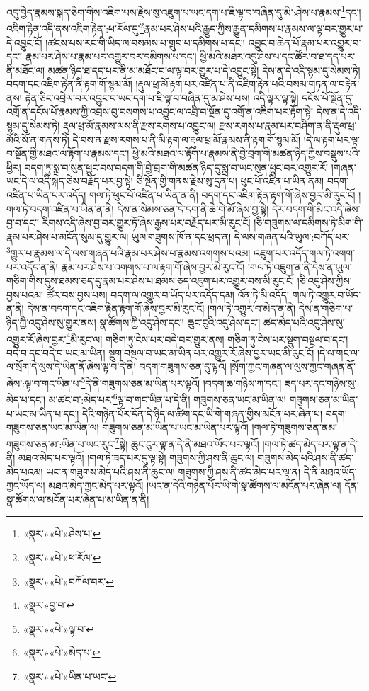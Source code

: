 འདུ་བྱེད་རྣམས་སྐད་ཅིག་གིས་འཇིག་པས་རྗེས་སུ་འཇུག་པ་ཡང་དག་པ་ཇི་ལྟ་བ་བཞིན་དུ་མི་:ཤེས་པ་རྣམས་\footnote{«སྣར་»«པེ་»ཤེས་པ་}དང་། འཇིག་རྟེན་འདི་ནས་འཇིག་རྟེན་:ཕ་རོལ་དུ་\footnote{«སྣར་»«པེ་»ཕ་རོལ་}རྣམ་པར་ཤེས་པའི་རྒྱུད་ཀྱིས་རྒྱུན་དམིགས་པ་རྣམས་ལ་ལྟ་བར་གྱུར་པ་དེ་འབྱུང་ངོ། །ཚངས་པས་རང་གི་ཡིད་ལ་བསམས་པ་གྲུབ་པ་དམིགས་པ་དང་། འབྱུང་བ་ཆེན་པོ་རྣམ་པར་འགྱུར་བ་དང་། རྣམ་པར་ཤེས་པ་རྣམ་པར་འགྱུར་བར་དམིགས་པ་དང་། ཕྱི་མའི་མཐར་འདུ་ཤེས་པ་དང་ཚོར་བ་ཐ་དད་པར་ནི་མཐོང་ལ། མཚན་ཉིད་ཐ་དད་པར་ནི་མ་མཐོང་བ་ལ་ལྟ་བར་གྱུར་པ་དེ་འབྱུང་སྟེ། དེས་ན་དེ་འདི་སྙམ་དུ་སེམས་ཏེ། བདག་དང་འཇིག་རྟེན་ནི་རྟག་གོ་སྙམ་མོ། །རྡུལ་ཕྲ་མོ་རྟག་པར་འཛིན་པ་ནི་འཇིག་རྟེན་པའི་བསམ་གཏན་ལ་བརྟེན་ནས། རྟེན་ཅིང་འབྲེལ་བར་འབྱུང་བ་ཡང་དག་པ་ཇི་ལྟ་བ་བཞིན་དུ་མ་ཤེས་པས། འདི་ལྟར་ལྟ་སྟེ། དངོས་པོ་སྔོན་དུ་འགྲོ་ན་དངོས་པོ་རྣམས་ཀྱི་འབྲས་བུ་བསགས་པ་འབྱུང་ལ་འབྲི་བ་སྔོན་དུ་འགྲོ་ན་འཇིག་པར་རྟོག་སྟེ། དེས་ན་དེ་འདི་སྙམ་དུ་སེམས་ཏེ། རྡུལ་ཕྲ་མོ་རྣམས་ལས་ནི་རྫས་རགས་པ་འབྱུང་ལ། རྫས་རགས་པ་རྣམ་པར་བཤིག་ན་ནི་རྡུལ་ཕྲ་མོའི་སོ་ན་གནས་ཏེ། དེ་བས་ན་རྫས་རགས་པ་ནི་མི་རྟག་ལ་རྡུལ་ཕྲ་མོ་རྣམས་ནི་རྟག་གོ་སྙམ་མོ། །དེ་ལ་རྟག་པར་ལྟ་བ་སྔོན་གྱི་མཐའ་ལ་རྟོག་པ་རྣམས་དང་། ཕྱི་མའི་མཐའ་ལ་རྟོག་པ་རྣམས་ནི་བྱེ་བྲག་གི་མཚན་ཉིད་ཀྱིས་བསྡུས་པའི་ཕྱིར། བདག་ཏུ་སྨྲ་བ་སུན་ཕྱུང་བས་བདག་གི་བྱེ་བྲག་གི་མཚན་ཉིད་དུ་སྨྲ་བ་ཡང་སུན་ཕྱུང་བར་འགྱུར་རོ། །གཞན་ཡང་དེ་ལ་འདི་སྐད་ཅེས་བརྗོད་པར་བྱ་སྟེ། ཅི་སྔོན་གྱི་གནས་རྗེས་སུ་དྲན་པ། ཕུང་པོ་འཛིན་པ་ཡིན་ནམ། བདག་འཛིན་པ་ཡིན་པར་འདོད། གལ་ཏེ་ཕུང་པོ་འཛིན་པ་ཡིན་ན་ནི། བདག་དང་འཇིག་རྟེན་རྟག་གོ་ཞེས་བྱར་མི་རུང་ངོ། །གལ་ཏེ་བདག་འཛིན་པ་ཡིན་ན་ནི། དེས་ན་སེམས་ཅན་དེ་དག་ནི་ཆེ་གེ་མོ་ཞེས་བྱ་སྟེ། དེར་བདག་གི་མིང་འདི་ཞེས་བྱ་བ་དང་། རིགས་འདི་ཞེས་བྱ་བར་གྱུར་ཏོ་ཞེས་རྒྱས་པར་བརྗོད་པར་མི་རུང་ངོ། །ཅི་གཟུགས་ལ་དམིགས་ཏེ་མིག་གི་རྣམ་པར་ཤེས་པ་མངོན་སུམ་དུ་གྱུར་ལ། ཡུལ་གཟུགས་ཁོ་ན་དང་ཕྲད་ན། དེ་ལས་གཞན་པའི་ཡུལ་:བཀོད་པར་\footnote{«སྣར་»«པེ་»བཀོལ་བར་}གྱུར་པ་རྣམས་ལ་དེ་ལས་གཞན་པའི་རྣམ་པར་ཤེས་པ་རྣམས་འགགས་པའམ། འཇུག་པར་འདོད་གལ་ཏེ་འགག་པར་འདོད་ན་ནི། རྣམ་པར་ཤེས་པ་འགགས་པ་ལ་རྟག་གོ་ཞེས་བྱར་མི་རུང་ངོ། །གལ་ཏེ་འཇུག་ན་ནི་དེས་ན་ཡུལ་གཅིག་གིས་དུས་ཐམས་ཅད་དུ་རྣམ་པར་ཤེས་པ་ཐམས་ཅད་འཇུག་པར་འགྱུར་བས་མི་རུང་ངོ། །ཅི་འདུ་ཤེས་ཀྱིས་བྱས་པའམ། ཚོར་བས་བྱས་པས། བདག་ལ་འགྱུར་བ་ཡོད་པར་འདོད་དམ། འོན་ཏེ་མི་འདོད། གལ་ཏེ་འགྱུར་བ་ཡོད་ན་ནི། དེས་ན་བདག་དང་འཇིག་རྟེན་རྟག་གོ་ཞེས་བྱར་མི་རུང་ངོ། །གལ་ཏེ་འགྱུར་བ་མེད་ན་ནི། དེས་ན་གཅིག་པ་ཉིད་ཀྱི་འདུ་ཤེས་སུ་གྱུར་ནས། སྣ་ཚོགས་ཀྱི་འདུ་ཤེས་དང་། ཆུང་ངུའི་འདུ་ཤེས་དང་། ཚད་མེད་པའི་འདུ་ཤེས་སུ་འགྱུར་རོ་ཞེས་བྱར་\footnote{«སྣར་»བྱ་བ་}མི་རུང་ལ། གཅིག་ཏུ་ངེས་པར་བདེ་བར་གྱུར་ནས། གཅིག་ཏུ་ངེས་པར་སྡུག་བསྔལ་བ་དང་། བདེ་བ་དང་བདེ་བ་ཡང་མ་ཡིན། སྡུག་བསྔལ་བ་ཡང་མ་ཡིན་པར་འགྱུར་རོ་ཞེས་བྱར་ཡང་མི་རུང་ངོ། །དེ་ལ་གང་ལ་ལ་སྲོག་དེ་ལུས་དེ་ཡིན་ནོ་ཞེས་ལྟ་བ་དེ་ནི། བདག་གཟུགས་ཅན་དུ་ལྟའོ། །སྲོག་ཀྱང་གཞན་ལ་ལུས་ཀྱང་གཞན་ནོ་ཞེས་:ལྟ་བ་གང་ཡིན་པ་\footnote{«སྣར་»«པེ་»ལྟ་བ་}དེ་ནི་གཟུགས་ཅན་མ་ཡིན་པར་ལྟའོ། །བདག་ཆ་གཉིས་ཀ་དང་། ཟད་པར་དང་གཉིས་སུ་མེད་པ་དང་། མ་ཚང་བ་:མེད་པར་\footnote{«སྣར་»«པེ་»མེད་པ་}ལྟ་བ་གང་ཡིན་པ་དེ་ནི། གཟུགས་ཅན་ཡང་མ་ཡིན་ལ། གཟུགས་ཅན་མ་ཡིན་པ་ཡང་མ་ཡིན་པ་དང་། དེའི་གཉེན་པོར་དོན་དེ་ཉིད་ལ་ཚིག་དང་ཡི་གེ་གཞན་གྱིས་མངོན་པར་ཞེན་པ། བདག་གཟུགས་ཅན་ཡང་མ་ཡིན་ལ། གཟུགས་ཅན་མ་ཡིན་པ་ཡང་མ་ཡིན་པར་ལྟའོ། །གལ་ཏེ་གཟུགས་ཅན་ནམ། གཟུགས་ཅན་མ་:ཡིན་པ་ཡང་རུང་\footnote{«སྣར་»«པེ་»ཡིན་པ་ཡང་}སྟེ། ཆུང་ངུར་ལྟ་ན་དེ་ནི་མཐའ་ཡོད་པར་ལྟའོ། །གལ་ཏེ་ཚད་མེད་པར་ལྟ་ན་དེ་ནི། མཐའ་མེད་པར་ལྟའོ། །གལ་ཏེ་ཟད་པར་དུ་ལྟ་སྟེ། གཟུགས་ཀྱི་ཤས་ནི་ཆུང་ལ། གཟུགས་མེད་པའི་ཤས་ནི་ཚད་མེད་པའམ། ཡང་ན་གཟུགས་མེད་པའི་ཤས་ནི་ཆུང་ལ། གཟུགས་ཀྱི་ཤས་ནི་ཚད་མེད་པར་ལྟ་ན། དེ་ནི་མཐའ་ཡོད་ཀྱང་ཡོད་ལ། མཐའ་མེད་ཀྱང་མེད་པར་ལྟའོ། །ཡང་ན་དེའི་གཉེན་པོར་ཡི་གེ་སྣ་ཚོགས་ལ་མངོན་པར་ཞེན་ལ། དོན་སྣ་ཚོགས་ལ་མངོན་པར་ཞེན་པ་མ་ཡིན་ན་ནི། 